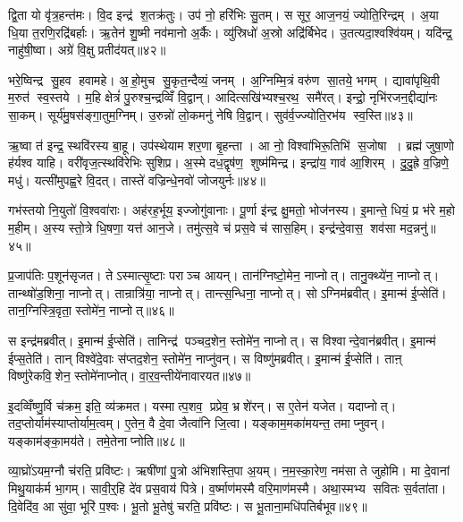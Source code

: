 द्वि॒ता यो वृ॑त्र॒हन्त॑मः। वि॒द इन्द्र॑ श॒तक्र॑तुः। उप॑ नो॒ हरि॑भिः सु॒तम्। स सूर॒ आज॒नयं॒ ज्योति॒रिन्द्रम्। अ॒या धि॒या त॒रणि॒रद्रि॑बर्\mbox{}हाः। ऋ॒तेन॑ शु॒ष्मी नव॑मानो अ॒र्कैः। व्यु॑स्रिधो॑ अ॒स्रो अद्रि॑र्बिभेद। उ॒तत्यदा॒श्वश्वि॑यम्। यदि॑न्द्र॒ नाहु॑षी॒ष्वा। अग्रे॑ वि॒क्षु प्रतीद॑यत्॥४२॥

भरे॒ष्विन्द्र सु॒हव हवामहे। अ॒हो॒मुच सु॒कृत॒न्दैव्यं॒ जनम्। अ॒ग्निम्मि॒त्रं वरु॑ण सा॒तये॒ भगम्। द्यावा॑पृथि॒वी म॒रुत॑ स्व॒स्तये। म॒हि क्षेत्रं॑ पु॒रुश्च॒न्द्रव्विँ वि॒द्वान्। आदित्सखि॑भ्यश्च॒रथ॒ समै॑रत्। इन्द्रो॒ नृभि॑रजन॒द्दीद्या॑नः सा॒कम्। सूर्य॑मु॒षस॑ङ्गा॒तुम॒ग्निम्। उ॒रुन्नो॑ लो॒कमनु॑ नेषि वि॒द्वान्। सुव॑र्व॒ज्ज्योति॒रभ॑य स्व॒स्ति॥४३॥

ऋ॒ष्वा त॑ इन्द्र॒ स्थवि॑रस्य बा॒हू। उप॑स्थेयाम शर॒णा बृ॒हन्ता। आ नो॒ विश्वा॑भिरू॒तिभि॑ स॒जोषा। ब्रह्म॑ जुषा॒णो ह॑र्यश्व याहि। वरी॑वृज॒त्स्थवि॑रेभिः सुशिप्र। अ॒स्मे दध॒द्वृष॑ण॒ शुष्म॑मिन्द्र। इन्द्रा॑य॒ गाव॑ आ॒शिरम्। दु॒दु॒ह्रे व॒ज्रिणे॒ मधु॑। यत्सी॑मुपह्व॒रे वि॒दत्। तास्ते॑ वज्रिन्धे॒नवो॑ जोजयुर्नः॥४४॥

गभ॑स्तयो नि॒युतो॑ वि॒श्ववा॑राः। अह॑रह॒र्भूय॒ इज्जोगु॑वानाः। पू॒र्णा इ॑न्द्र क्षु॒मतो॒ भोज॑नस्य। इ॒मान्ते॒ धियं॒ प्र भ॑रे म॒हो म॒हीम्। अ॒स्य स्तो॒त्रे धि॒षणा॒ यत्त॑ आन॒जे। तमु॑त्स॒वे च॑ प्रस॒वे च॑ सास॒हिम्। इन्द्र॑न्दे॒वास॒ शव॑सा मद॒न्ननु॑॥४५॥\anuvakamend[व॒ज्रिण॑मयत्स्व॒स्ति जो॑जयुर्नः स॒प्त च॑]

प्र॒जाप॑तिः प॒शून॑सृजत। तेऽस्मात्सृ॒ष्टाः पराञ्च आयन्। तान॑ग्निष्टो॒मेन॒ नाप्नोत्। तानु॒क्थ्ये॑न॒ नाप्नोत्। तान्थ्षो॑ड॒शिना॒ नाप्नोत्। तान्रात्रि॑या॒ नाप्नोत्। तान्त्स॒न्धिना॒ नाप्नोत्। सोऽग्निम॑ब्रवीत्। इ॒मान्म॑ ई॒प्सेति॑। तान॒ग्निस्त्रि॒वृता॒ स्तोमे॑न॒ नाप्नोत्॥४६॥

स इन्द्र॑मब्रवीत्। इ॒मान्म॑ ई॒प्सेति॑। तानिन्द्र॑ पञ्चद॒शेन॒ स्तोमे॑न॒ नाप्नोत्। स विश्वान्दे॒वान॑ब्रवीत्। इ॒मान्म॑ ईप्स॒तेति॑। तान् विश्वे॑दे॒वाः स॑प्तद॒शेन॒ स्तोमे॑न॒ नाप्नु॑वन्। स विष्णु॑मब्रवीत्। इ॒मान्म॑ ई॒प्सेति॑। ताऩ् विष्णु॑रेकवि॒शेन॒ स्तोमे॑नाप्नोत्। वा॒र॒व॒न्तीये॑नावारयत॥४७॥

इ॒दव्विँष्णु॒र्वि च॑क्रम॒ इति॒ व्य॑क्रमत। यस्मात्प॒शव॒ प्रप्रेव॒ भ्रशे॑रन्। स ए॒तेन॑ यजेत। यदाप्नोत्। तद॒प्तोर्याम॑स्याप्तोर्याम॒त्वम्। ए॒तेन॒ वै दे॒वा जैत्वा॑नि जि॒त्वा। यङ्काम॒मका॑मयन्त॒ तमाप्नुवन्। यङ्काम॑ङ्का॒मय॑ते। तमे॒तेनाप्नोति॥४८॥\anuvakamend[स्तोमे॑न॒ नाप्नो॑दवारयत॒ नव॑ च]

व्या॒घ्रो॑ऽयम॒ग्नौ च॑रति॒ प्रवि॑ष्टः। ऋषी॑णां पु॒त्रो अ॑भिशस्ति॒पा अ॒यम्। न॒म॒स्का॒रेण॒ नम॑सा ते जुहोमि। मा दे॒वानां मिथु॒याक॑र्म भा॒गम्। सावी॒र्॒हि दे॑व प्रस॒वाय॑ पित्रे। व॒र्ष्माण॑मस्मै वरि॒माण॑मस्मै। अथा॒स्मभ्य सवितः स॒र्वता॑ता। दि॒वेदि॑व॒ आ सु॑वा॒ भूरि॑ प॒श्वः। भू॒तो भू॒तेषु॑ चरति॒ प्रवि॑ष्टः। स भू॒ताना॒मधि॑पतिर्बभूव॥४९॥

